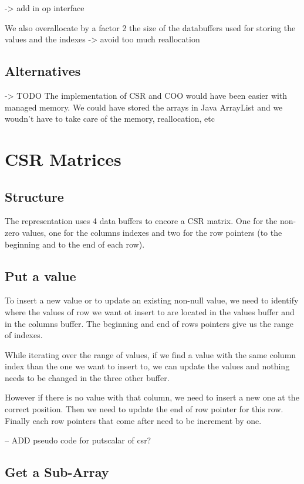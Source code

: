 -> add in op interface

We also overallocate by a factor 2 the size of the databuffers used for storing the values and the indexes -> avoid too much reallocation

\subsection{Alternatives}
-> TODO %
The implementation of CSR and COO would have been easier with managed memory. We could have stored the arrays in Java ArrayList and we woudn't have to take care of the memory, reallocation, etc 


\section{CSR Matrices}
\subsection{Structure}

The representation uses 4 data buffers to encore a CSR matrix. One for the non-zero values, one for the columns indexes and two for the row pointers (to the beginning and to the end of each row).

\subsection{Put a value}

To insert a new value or to update an existing non-null value, we need to identify where the values of row we want ot insert to are located in the values buffer and in the columns buffer. The beginning and end of rows pointers give us the range of indexes.

While iterating over the range of values, if we find a value with the same column index than the one we want to insert to, we can update the values and nothing needs to be changed in the three other buffer. 

However if there is no value with that column, we need to insert a new one at the correct position. Then we need to update the end of row pointer for this row. Finally each row pointers that come after need to be increment by one.

-- ADD pseudo code for putscalar of csr?



\subsection{Get a Sub-Array}

